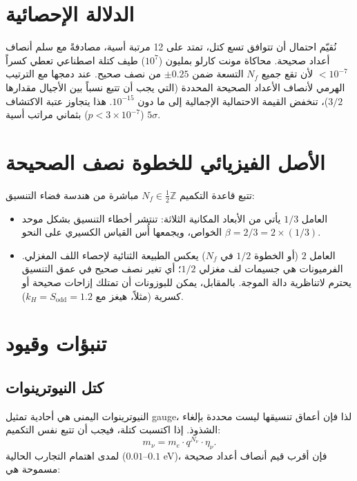\documentclass[12pt,a4paper]{article}
\begin{document}
	\section{الدلالة الإحصائية}
	نُقيّم احتمال أن تتوافق تسع كتل، تمتد على 12 مرتبة أسية، مصادفةً مع سلم أنصاف أعداد صحيحة. محاكاة مونت كارلو بمليون (\(10^7\)) طيف كتلة اصطناعي تعطي كسراً \(< 10^{-7}\) لأن تقع جميع \(N_f\) التسعة ضمن \(\pm 0.25\) من نصف صحيح. عند دمجها مع الترتيب الهرمي لأنصاف الأعداد الصحيحة المحددة (التي يجب أن تتبع نسباً بين الأجيال مقدارها \(3/2\))، تنخفض القيمة الاحتمالية الإجمالية إلى ما دون \(10^{-15}\). هذا يتجاوز عتبة الاكتشاف \(5\sigma\) (\(p < 3\times 10^{-7}\)) بثماني مراتب أسية.
	
	\section{الأصل الفيزيائي للخطوة نصف الصحيحة}
	تتبع قاعدة التكميم \(N_f \in \frac{1}{2}\mathbb{Z}\) مباشرة من هندسة فضاء التنسيق:
	\begin{itemize}
		\item العامل \(1/3\) يأتي من الأبعاد المكانية الثلاثة: تنتشر أخطاء التنسيق بشكل موحد الخواص، ويجمعها أُس القياس الكسيري على النحو \(\beta = 2/3 = 2 \times (1/3)\).
		\item العامل \(2\) (أو الخطوة \(1/2\) في \(N_f\)) يعكس الطبيعة الثنائية لإحصاء اللف المغزلي. الفرميونات هي جسيمات لف مغزلي \(1/2\)؛ أي تغير نصف صحيح في عمق التنسيق يحترم لاتناظرية دالة الموجة. بالمقابل، يمكن للبوزونات أن تمتلك إزاحات صحيحة أو كسرية (مثلاً، هيغز مع \(k_H = S_{\mathrm{odd}} = 1.2\)).
	\end{itemize}
	
	\section{تنبؤات وقيود}
	
	\subsection{كتل النيوترينوات}
	النيوترينوات اليمنى هي أحادية تمثيل gauge، لذا فإن أعماق تنسيقها ليست محددة بإلغاء الشذوذ. إذا اكتسبت كتلة، فيجب أن تتبع نفس التكميم:
	\begin{equation}
		m_\nu = m_e \cdot q^{N_\nu} \cdot \eta_\nu.
	\end{equation}
	لمدى اهتمام التجارب الحالية (\(0.01\)--\(0.1\) eV)، فإن أقرب قيم أنصاف أعداد صحيحة مسموحة هي:
	
\end{document}
